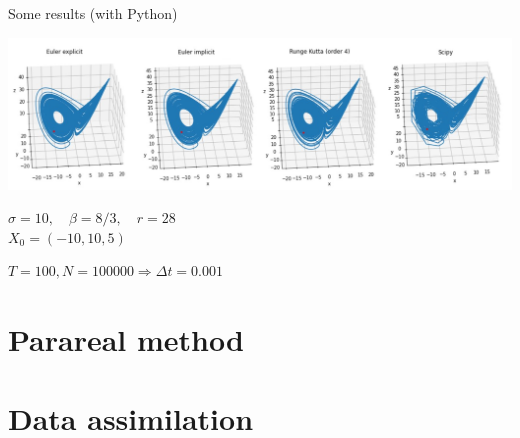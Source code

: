 \documentclass[10pt,xcolor={table,dvipsnames},t]{beamer}
\begin{document}
	\begin{frame}{Some results (with Python)}
		
		\includegraphics[width=\textwidth]{images/N100000.png} \\ 
		\begin{center}
			\begin{minipage}[c]{0.5\linewidth}
				$\sigma=10,\quad \beta=8/3, \quad r=28$ \\
				$X_0=(-10,10,5)$ 
			\end{minipage}
			$T=100, N = 100000 \Rightarrow \Delta t=0.001$
		\end{center}
		
	\end{frame}

	\section{Parareal method}

	
	
	\section{Data assimilation}
	
	
	
\end{document}
